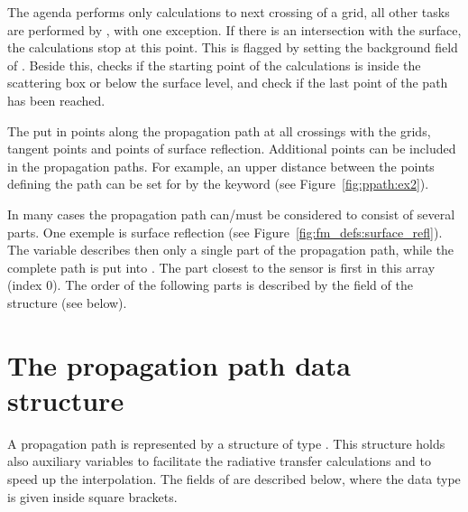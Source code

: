 The agenda performs only calculations to next crossing of a grid, all
other tasks are performed by , with one exception.
If there is an intersection with the surface, the calculations stop at
this point. This is flagged by setting the background field of
. Beside this,  checks if
the starting point of the calculations is inside the scattering box or
below the surface level, and check if the last point of the path has
been reached. 

The  put in points along the
propagation path at all crossings with the grids, tangent points and
points of surface reflection. Additional points can be included in the
propagation paths. For example, an upper distance between the points
defining the path can be set for  by
the keyword  (see Figure~\ref{fig:ppath:ex2}).

In many cases the propagation path can/must be considered to consist
of several parts. One exemple is surface reflection (see
Figure~\ref{fig:fm_defs:surface_refl}). The variable 
describes then only a single part of the propagation path, while the
complete path is put into . The part closest to
the sensor is first in this array (index 0). The order of the
following parts is described by the  field
of the  structure (see below).



\section{The propagation path data structure}
\label{sec:ppath:Ppath}

A propagation path is represented by a structure of type
. This structure holds also auxiliary variables to
facilitate the radiative transfer calculations and to speed up the
interpolation. The fields of  are described below,
where the data type is given inside square brackets. 

